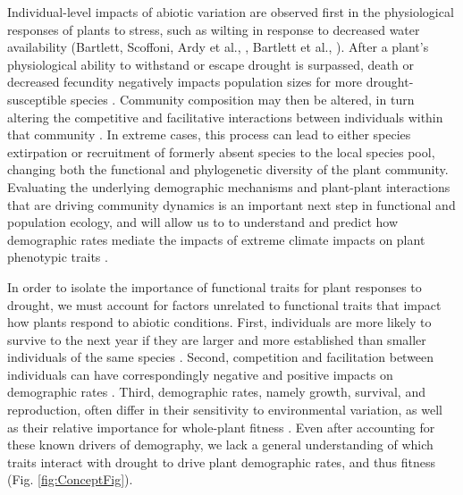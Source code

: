 \documentclass[12pt, letterpaper]{article}
\begin{document}
Individual-level impacts of abiotic variation are observed first in the physiological responses of plants to stress, such as wilting in response to decreased water availability (Bartlett, Scoffoni, Ardy et al., , Bartlett et al., \citeyear{Bartlett2016TheDrought}). After a plant’s physiological ability to withstand or escape drought is surpassed, death or decreased fecundity negatively impacts population sizes for more drought-susceptible species \cite{Koerner2014}. Community composition may then be altered, in turn altering the competitive and facilitative interactions between individuals within that community \cite{Ploughe2019CommunityInteractions, Harrison2015Climate-drivenCommunity}. In extreme cases, this process can lead to either species extirpation or recruitment of formerly absent species to the local species pool, changing both the functional and phylogenetic diversity of the plant community. Evaluating the underlying demographic mechanisms and plant-plant interactions that are driving community dynamics is an important next step in functional and population ecology, and will allow us to to understand and predict how demographic rates mediate the impacts of extreme climate impacts on plant phenotypic traits .

In order to isolate the importance of functional traits for plant responses to drought, we must account for factors unrelated to functional traits that impact how plants respond to abiotic conditions. First, individuals are more likely to survive to the next year if they are larger and more established than smaller individuals of the same species . Second, competition and facilitation between individuals can have correspondingly negative and positive impacts on demographic rates . Third, demographic rates, namely growth, survival, and reproduction, often differ in their sensitivity to environmental variation, as well as their relative importance for whole-plant fitness . Even after accounting for these known drivers of demography, we lack a general understanding of which traits interact with drought to drive plant demographic rates, and thus fitness (Fig. \ref{fig:ConceptFig}).
\end{document}
